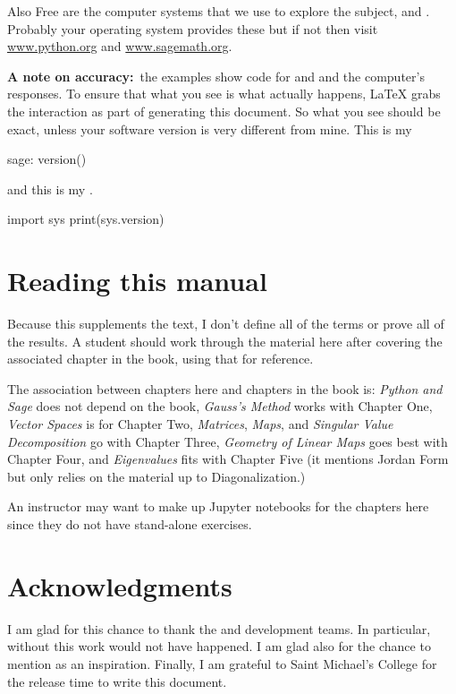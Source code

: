 Also Free are the computer systems that we use to explore the subject,
\python{} and \Sage{}.
Probably your operating system provides these but if not then visit 
\href{http://www.python.org}{\url{www.python.org}}
and 
\href{https://www.sagemath.org}{\url{www.sagemath.org}}.

\textbf{A note on accuracy:}~the examples 
show code for \python{} and \Sage{} and the computer's responses.
To ensure that what you see is what actually happens,
\LaTeX{} grabs the interaction as part of generating this document.  
So what you see should be exact,
unless your software version is very different from mine.
This is my \Sage
\begin{sagecommandline}
sage: version()  
\end{sagecommandline}
and this is my \python{}. 
\begin{pythonconsole}
import sys
print(sys.version)
\end{pythonconsole}




\section{Reading this manual}
Because this supplements the text, 
I don't define all of the terms or prove all of the results.
A student should work through the material here after covering the associated
chapter in the book, using that for reference.

The association between chapters here and chapters in the book is:
\textit{Python and Sage} does not depend on the
book,
\textit{Gauss’s Method} works with Chapter One,
\textit{Vector Spaces} is for Chapter Two,
\textit{Matrices}, 
\textit{Maps}, and 
\textit{Singular Value Decomposition} go with Chapter Three,
\textit{Geometry of Linear Maps} goes best with Chapter Four,
and \textit{Eigenvalues} fits with Chapter Five
(it mentions Jordan Form but only relies on the material up to 
Diagonalization.)

An instructor may want to make up Jupyter notebooks for the chapters here
since they do not have stand-alone exercises.




\section{Acknowledgments}
I am glad for this chance to thank the \python{} and
\Sage{} development teams.
In particular,
without \citep{SageTeam12ref} this work would not have happened.
I am glad also for the chance to mention 
\citep{Beezer11} as an inspiration.
Finally, I am grateful to Saint Michael's College for the 
release time to write this document.





